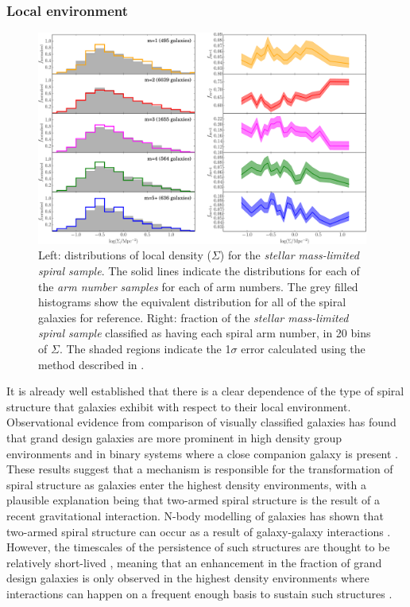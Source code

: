 \documentclass[useAMS,usenatbib]{mn2e}
\begin{document}
\subsubsection{Local environment}
\label{sec:environment}

\begin{figure}
		\centering

        \includegraphics[width=0.975\textwidth]{Images/Results/density_plots.pdf}

        \caption{Left: distributions of local density ($\Sigma$) for the \textit{stellar mass-limited spiral sample}. The solid lines indicate the distributions for each of the \textit{arm number samples} for each of arm numbers. The grey filled histograms show the equivalent distribution for all of the spiral galaxies for reference. Right: fraction of the \textit{stellar mass-limited spiral sample} classified as having each spiral arm number, in 20 bins of $\Sigma$. The shaded regions indicate the 1$\sigma$ error calculated using the method described in \citet{Cameron_11}.}

        \label{fig:density_plots}

\end{figure}

It is already well established that there is a clear dependence of the type of spiral structure that galaxies exhibit with respect to their local environment. Observational evidence from comparison of visually classified galaxies has found that grand design galaxies are more prominent in high density group environments  and in binary systems where a close companion galaxy is present \citep{EE_82,EE_87,Seigar_03,Elmegreen_11}. These results suggest that a mechanism is responsible for the transformation of spiral structure as galaxies enter the highest density environments, with a plausible explanation being that two-armed spiral structure is the result of a recent gravitational interaction. N-body modelling of galaxies has shown that two-armed spiral structure can occur as a result of galaxy-galaxy interactions \citep{Sundelius_87,Dobbs_10}. However, the timescales of the persistence of such structures are thought to be relatively short-lived \citep{Oh_08,Dobbs_10}, meaning that an enhancement in the fraction of grand design galaxies is only observed in the highest density environments where interactions can happen on a frequent enough basis to sustain such structures \citep{EE_86}.
\end{document}
